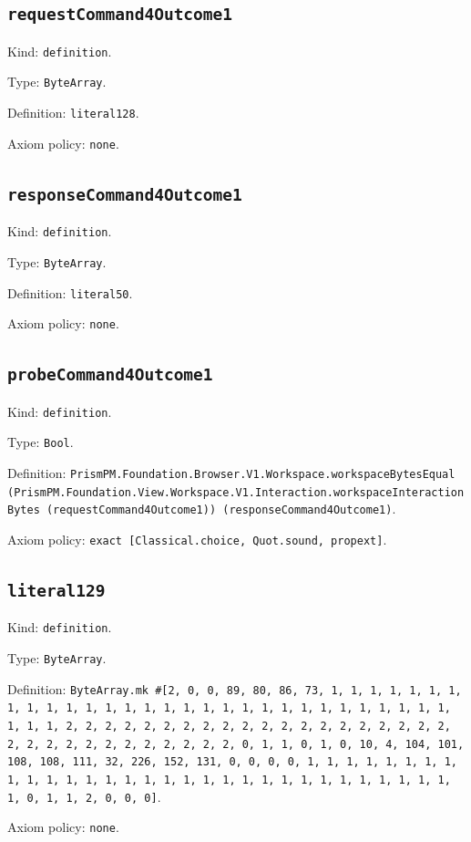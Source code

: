 \documentclass[11pt]{article}
\begin{document}
\subsection*{\texttt{requestCommand4Outcome1}}
\noindent Kind: \texttt{definition}.\par
\noindent Type: \texttt{ByteArray}.\par
\noindent Definition: \texttt{literal128}.\par
\noindent Axiom policy: \texttt{none}.\par
\subsection*{\texttt{responseCommand4Outcome1}}
\noindent Kind: \texttt{definition}.\par
\noindent Type: \texttt{ByteArray}.\par
\noindent Definition: \texttt{literal50}.\par
\noindent Axiom policy: \texttt{none}.\par
\subsection*{\texttt{probeCommand4Outcome1}}
\noindent Kind: \texttt{definition}.\par
\noindent Type: \texttt{Bool}.\par
\noindent Definition: \texttt{PrismPM.Foundation.Browser.V1.Workspace.workspaceBytesEqual (PrismPM.Foundation.View.Workspace.V1.Interaction.workspaceInteractionBytes (requestCommand4Outcome1)) (responseCommand4Outcome1)}.\par
\noindent Axiom policy: \texttt{exact [Classical.choice, Quot.sound, propext]}.\par
\subsection*{\texttt{literal129}}
\noindent Kind: \texttt{definition}.\par
\noindent Type: \texttt{ByteArray}.\par
\noindent Definition: \texttt{ByteArray.mk \#[2, 0, 0, 89, 80, 86, 73, 1, 1, 1, 1, 1, 1, 1, 1, 1, 1, 1, 1, 1, 1, 1, 1, 1, 1, 1, 1, 1, 1, 1, 1, 1, 1, 1, 1, 1, 1, 1, 1, 1, 2, 2, 2, 2, 2, 2, 2, 2, 2, 2, 2, 2, 2, 2, 2, 2, 2, 2, 2, 2, 2, 2, 2, 2, 2, 2, 2, 2, 2, 2, 2, 2, 0, 1, 1, 0, 1, 0, 10, 4, 104, 101, 108, 108, 111, 32, 226, 152, 131, 0, 0, 0, 0, 1, 1, 1, 1, 1, 1, 1, 1, 1, 1, 1, 1, 1, 1, 1, 1, 1, 1, 1, 1, 1, 1, 1, 1, 1, 1, 1, 1, 1, 1, 1, 1, 0, 1, 1, 2, 0, 0, 0]}.\par
\noindent Axiom policy: \texttt{none}.\par
\end{document}
